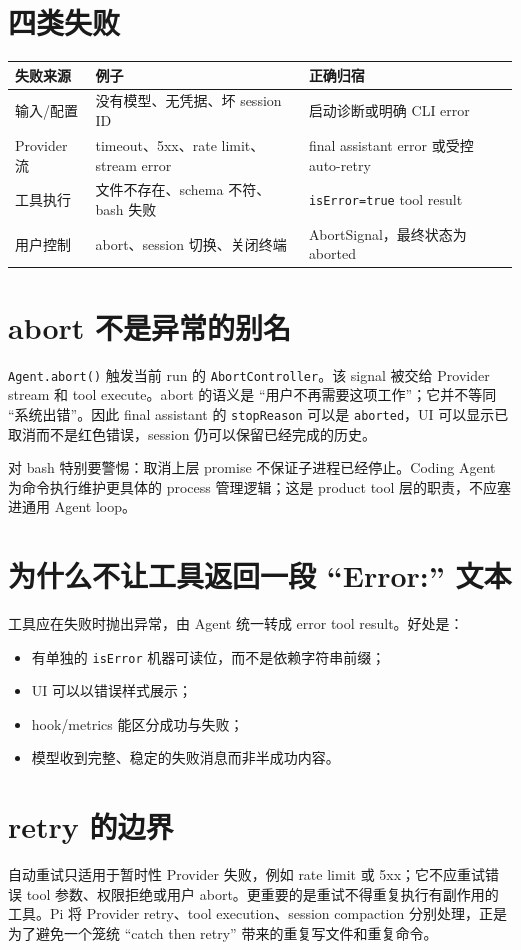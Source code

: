 \documentclass[UTF8,openany,11pt]{ctexbook}
\begin{document}
\section{四类失败}
\begin{longtable}{p{}p{}p{}}
\toprule
失败来源 & 例子 & 正确归宿\\
\midrule
输入/配置 & 没有模型、无凭据、坏 session ID & 启动诊断或明确 CLI error\\
Provider 流 & timeout、5xx、rate limit、stream error & final assistant error 或受控 auto-retry\\
工具执行 & 文件不存在、schema 不符、bash 失败 & \texttt{isError=true} tool result\\
用户控制 & abort、session 切换、关闭终端 & AbortSignal，最终状态为 aborted\\
\bottomrule
\end{longtable}

\section{abort 不是异常的别名}
\texttt{Agent.abort()} 触发当前 run 的 \texttt{AbortController}。该 signal 被交给 Provider stream 和 tool execute。abort 的语义是 ``用户不再需要这项工作''；它并不等同 ``系统出错''。因此 final assistant 的 \texttt{stopReason} 可以是 \texttt{aborted}，UI 可以显示已取消而不是红色错误，session 仍可以保留已经完成的历史。

对 bash 特别要警惕：取消上层 promise 不保证子进程已经停止。Coding Agent 为命令执行维护更具体的 process 管理逻辑；这是 product tool 层的职责，不应塞进通用 Agent loop。

\section{为什么不让工具返回一段 ``Error:'' 文本}
工具应在失败时抛出异常，由 Agent 统一转成 error tool result。好处是：
\begin{itemize}
\item 有单独的 \texttt{isError} 机器可读位，而不是依赖字符串前缀；
\item UI 可以以错误样式展示；
\item hook/metrics 能区分成功与失败；
\item 模型收到完整、稳定的失败消息而非半成功内容。
\end{itemize}

\section{retry 的边界}
自动重试只适用于暂时性 Provider 失败，例如 rate limit 或 5xx；它不应重试错误 tool 参数、权限拒绝或用户 abort。更重要的是重试不得重复执行有副作用的工具。Pi 将 Provider retry、tool execution、session compaction 分别处理，正是为了避免一个笼统 ``catch then retry'' 带来的重复写文件和重复命令。
\end{document}
